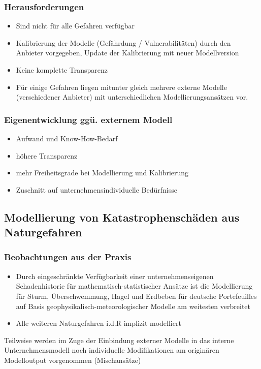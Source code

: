 \documentclass[12pt]{report}
\theoremstyle{dotless}
\theoremstyle{definition}
\begin{document}
\subsubsection{Herausforderungen}
\begin{itemize}
\item Sind nicht für alle Gefahren verfügbar
\item Kalibrierung der Modelle (Gefährdung / Vulnerabilitäten) durch den Anbieter vorgegeben, Update der Kalibrierung mit neuer Modellversion
\item Keine komplette Transparenz
\item Für einige Gefahren liegen mitunter gleich mehrere externe Modelle (verschiedener Anbieter) mit unterschiedlichen Modellierungsansätzen vor. 
\end{itemize}

\subsubsection{Eigenentwicklung ggü. externem Modell}
\begin{itemize}
\item Aufwand und Know-How-Bedarf
\item höhere Transparenz
\item mehr Freiheitsgrade bei Modellierung und Kalibrierung
\item Zuschnitt auf unternehmensindividuelle Bedürfnisse
\end{itemize}

\subsection{Modellierung von Katastrophenschäden aus Naturgefahren}

\subsubsection{Beobachtungen aus der Praxis}
\begin{itemize}
\item Durch eingeschränkte Verfügbarkeit einer unternehmenseigenen Schadenhistorie für mathematisch-statistischer Ansätze ist die Modellierung für Sturm, Überschwemmung, Hagel und Erdbeben für deutsche Portefeuilles auf
Basis geophysikalisch-meteorologischer Modelle am weitesten verbreitet
\item Alle weiteren Naturgefahren i.d.R implizit modelliert
\end{itemize}
Teilweise werden im Zuge der Einbindung externer Modelle in das interne Unternehmensmodell noch individuelle Modifikationen am originären Modelloutput vorgenommen (Mischansätze)
\end{document}
